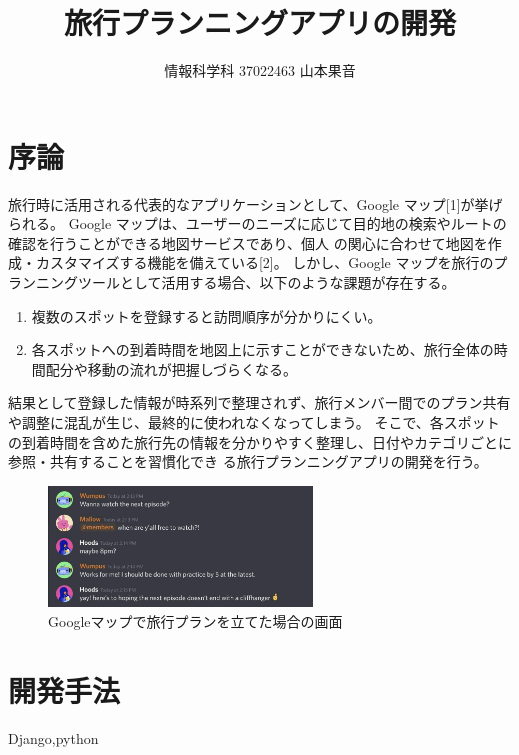 \documentclass[a4j,twocolumn]{jsarticle}
\begin{document}
  \title{旅行プランニングアプリの開発}
  \author{情報科学科 \hspace{5mm} 37022463 \hspace{5mm} 山本果音}
  \date{}

  \maketitle


\section{序論}
\label{sec:org6d65ae4}
旅行時に活用される代表的なアプリケーションとして、Google マップ[1]が挙げられる。
Google マップは、ユーザーのニーズに応じて目的地の検索やルートの確認を行うことができる地図サービスであり、個人
の関心に合わせて地図を作成・カスタマイズする機能を備えている[2]。
しかし、Google マップを旅行のプランニングツールとして活用する場合、以下のような課題が存在する。
\begin{enumerate}
\item 複数のスポットを登録すると訪問順序が分かりにくい。
\item 各スポットへの到着時間を地図上に示すことができないため、旅行全体の時間配分や移動の流れが把握しづらくなる。
\end{enumerate}
結果として登録した情報が時系列で整理されず、旅行メンバー間でのプラン共有や調整に混乱が生じ、最終的に使われなくなってしまう。
そこで、各スポットの到着時間を含めた旅行先の情報を分かりやすく整理し、日付やカテゴリごとに参照・共有することを習慣化でき
る旅行プランニングアプリの開発を行う。


\begin{figure}[htbp]
\centering
\includegraphics[width=7cm]{./figs/discord.jpg}
\caption{\label{fig:org4bc6090}Googleマップで旅行プランを立てた場合の画面}
\end{figure}


\section{開発手法}
\label{sec:org0bfd248}
Django,python
\end{document}
